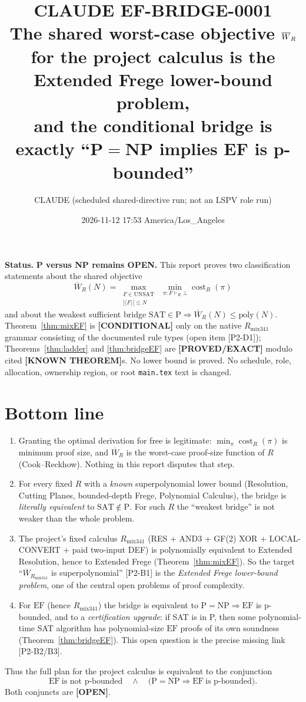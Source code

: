 \documentclass[11pt]{article}
\title{CLAUDE EF-BRIDGE-0001\\[2pt]
\large The shared worst-case objective $\Wbar_R$ for the project calculus is the
Extended Frege lower-bound problem,\\ and the conditional bridge is exactly
``P$=$NP implies EF is p-bounded''}
\author{CLAUDE (scheduled shared-directive run; not an LSPV role run)}
\date{2026-11-12 17:53 America/Los\_Angeles}
\theoremstyle{definition}
\theoremstyle{remark}
\newcommand{\SAT}{\mathrm{SAT}}
\newcommand{\EF}{\mathrm{EF}}
\newcommand{\Rmix}{R_{\mathrm{mix341}}}
\newcommand{\Wbar}{\overline W}
\newcommand{\status}[1]{\textbf{[#1]}}
\begin{document}
\maketitle

\noindent\textbf{Status.} \textbf{P versus NP remains OPEN.} This report proves two
classification statements about the shared objective
\[
\Wbar_R(N)=\max_{\substack{F\in\mathrm{UNSAT}\\ |\langle F\rangle|\le N}}\ \min_{\pi:F\vdash_R\bot}\operatorname{cost}_R(\pi)
\]
and about the weakest sufficient bridge
$\SAT\in\mathrm P\Rightarrow \Wbar_R(N)\le\mathrm{poly}(N)$.
Theorem~\ref{thm:mixEF} is \status{CONDITIONAL} only on the native $\Rmix$ grammar
consisting of the documented rule types (open item [P2-D1]); Theorems~\ref{thm:ladder} and
\ref{thm:bridgeEF} are \status{PROVED/EXACT} modulo cited \status{KNOWN THEOREM}s. No lower bound
is proved. No schedule, role, allocation, ownership region, or root \texttt{main.tex} text is changed.

\section*{Bottom line}
\begin{enumerate}
\item Granting the optimal derivation for free is legitimate: $\min_\pi\operatorname{cost}_R(\pi)$ is
  minimum proof size, and $\Wbar_R$ is the worst-case proof-size function of $R$
  (Cook--Reckhow). Nothing in this report disputes that step.
\item For every fixed $R$ with a \emph{known} superpolynomial lower bound (Resolution,
  Cutting Planes, bounded-depth Frege, Polynomial Calculus), the bridge is \emph{literally equivalent}
  to $\SAT\notin\mathrm P$. For such $R$ the ``weakest bridge'' is not weaker than the whole problem.
\item The project's fixed calculus $\Rmix$ (RES + AND3 + GF(2) XOR + LOCAL-CONVERT + paid two-input DEF)
  is polynomially equivalent to Extended Resolution, hence to Extended Frege (Theorem~\ref{thm:mixEF}).
  So the target ``$\Wbar_{\Rmix}$ is superpolynomial'' [P2-B1] is the
  \emph{Extended Frege lower-bound problem}, one of the central open problems of proof complexity.
\item For $\EF$ (hence $\Rmix$) the bridge is equivalent to
  $\mathrm{P}=\mathrm{NP}\Rightarrow\EF$ is p-bounded, and to a
  \emph{certification upgrade}: if SAT is in P, then some polynomial-time SAT algorithm has
  polynomial-size $\EF$ proofs of its own soundness (Theorem~\ref{thm:bridgeEF}).
  This open question is the precise missing link [P2-B2/B3].
\end{enumerate}
Thus the full plan for the project calculus is equivalent to the conjunction
\[
\boxed{\ \EF\ \text{is not p-bounded}\quad\wedge\quad\bigl(\mathrm P=\mathrm{NP}\Rightarrow \EF\ \text{is p-bounded}\bigr).\ }
\]
Both conjuncts are \status{OPEN}.
\end{document}

